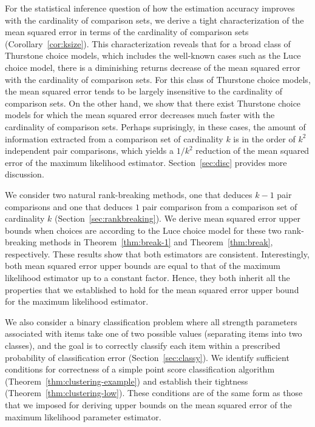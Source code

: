 For the statistical inference question of how the estimation accuracy improves with the cardinality of comparison sets, we derive a tight characterization of the mean squared error in terms of the cardinality of comparison sets (Corollary~\ref{cor:ksize}). This characterization reveals that for a broad class of Thurstone choice models, which includes the well-known cases such as the Luce choice model, there is a diminishing returns decrease of the mean squared error with the cardinality of comparison sets. For this class of Thurstone choice models, the mean squared error tends to be largely insensitive to the cardinality of comparison sets. On the other hand, we show that there exist Thurstone choice models for which the mean squared error decreases much faster with the cardinality of comparison sets. Perhaps suprisingly, in these cases, the amount of information extracted from a comparison set of cardinality $k$ is in the order of $k^2$ independent pair comparisons, which yields a $1/k^2$ reduction of the mean squared error of the maximum likelihood estimator. Section~\ref{sec:disc} provides more discussion.   

We consider two natural rank-breaking methods, one that deduces $k-1$ pair comparisons and one that deduces $1$ pair comparison from a comparison set of cardinality $k$ (Section~\ref{sec:rankbreaking}). We derive mean squared error upper bounds when choices are according to the Luce choice model for these two rank-breaking methods in Theorem~\ref{thm:break-1} and Theorem~\ref{thm:break}, respectively. These results show that both estimators are consistent. Interestingly, both mean squared error upper bounds are equal to that of the maximum likelihood estimator up to a constant factor. Hence, they both inherit all the properties that we established to hold for the mean squared error upper bound for the maximum likelihood estimator.   

We also consider a binary classification problem where all strength parameters associated with items take one of two possible values (separating items into two classes), and the goal is to correctly classify each item within a prescribed probability of classification error (Section~\ref{sec:classy}). We identify sufficient conditions for correctness of a simple point score classification algorithm (Theorem~\ref{thm:clustering-example}) and establish their tightness (Theorem~\ref{thm:clustering-low}). These conditions are of the same form as those that we imposed for deriving upper bounds on the mean squared error of the maximum likelihood parameter estimator.  

